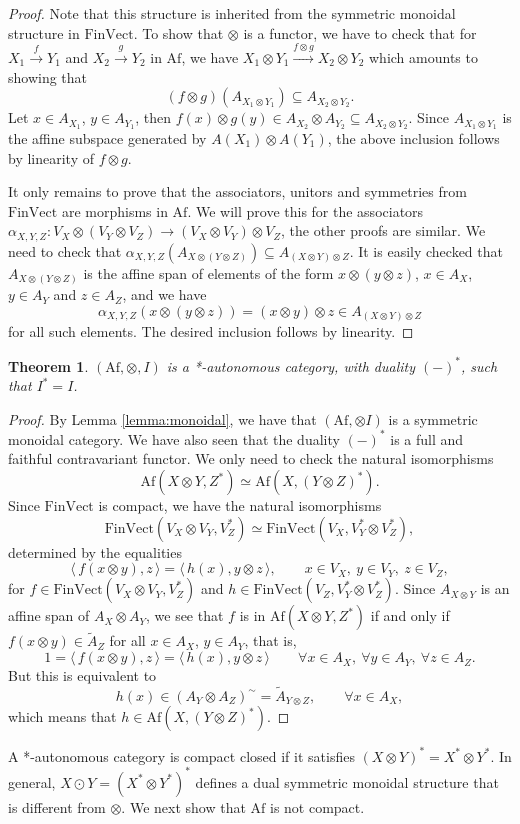 \documentclass[12pt]{article}
\newtheorem{theorem}{Theorem}
\theoremstyle{definition}
\theoremstyle{remark}
\def\<{\langle\,}
\def\>{\,\rangle}
\def \Af{\mathrm{Af}}
\def \FV{\mathrm{FinVect}}
\begin{document}
\begin{proof} Note that this structure is inherited from the symmetric monoidal structure
in $\FV$. To show that $\otimes$ is a functor, we have to check that for $X_1\xrightarrow{f} Y_1$ and $X_2\xrightarrow{g} Y_2$ in
$\Af$, we have $X_1\otimes Y_1\xrightarrow{f\otimes g} X_2\otimes Y_2$ which amounts to
showing that 
\[
(f\otimes g)(A_{X_1\otimes Y_1})\subseteq A_{X_2\otimes Y_2}.
\]
Let $x\in A_{X_1}$, $y\in A_{Y_1}$, then $f(x)\otimes g(y)\in A_{X_2}\otimes
A_{Y_2}\subseteq A_{X_2\otimes Y_2}$. Since  $A_{X_1\otimes Y_1}$ is the affine subspace
generated by $A(X_1)\otimes A(Y_1)$, the above inclusion follows by linearity of $f\otimes
g$. 

It only remains to prove that the associators, unitors and symmetries from
$\FV$ are morphisms in $\Af$. We will prove this for the associators $\alpha_{X,Y,Z}:V_X\otimes (V_Y\otimes V_Z)\to
(V_X\otimes V_Y)\otimes V_Z$, the other proofs are similar. We need to check that
$\alpha_{X,Y,Z}(A_{X\otimes(Y\otimes Z)})\subseteq A_{(X\otimes Y)\otimes Z}$. It is easily
checked that $A_{X\otimes(Y\otimes Z)}$ is the affine span of elements of the form
$x\otimes (y\otimes z)$, $x\in A_X$, $y\in A_Y$ and $z\in A_Z$, and we have
\[
\alpha_{X,Y,Z}(x\otimes (y\otimes z))=(x\otimes y)\otimes z\in A_{(X\otimes Y)\otimes Z}
\]
for all such elements. The desired inclusion follows by linearity.

\end{proof}


\begin{theorem} $(\Af,\otimes,I)$ is a *-autonomous category, with duality $(-)^*$, such
that $I^*=I$.

\end{theorem}


\begin{proof} By Lemma \ref{lemma:monoidal}, we have that $(\Af,\otimes I)$ is a symmetric
monoidal category. We have also seen that the duality $(-)^*$ is a full and faithful
contravariant functor. We only need to check the natural isomorphisms 
\[
\Af(X\otimes Y,Z^*)\simeq \Af(X,(Y\otimes Z)^*).
\]
Since $\FV$ is compact, we have the natural isomorphisms
\[
\FV(V_X\otimes V_Y,V^*_Z)\simeq \FV(V_X,V_Y^*\otimes V_Z^*),
\]
determined by the equalities
\[
\<f(x\otimes y),z\>=\<h(x),y\otimes z\>,\qquad x\in V_X,\ y\in V_Y,\ z\in V_Z,
\]
for $f\in \FV(V_X\otimes V_Y,V_Z^*)$ and $h\in \FV(V_Z,V_Y^*\otimes V_Z^*)$. Since
$A_{X\otimes Y}$ is an affine span of $A_X\otimes A_Y$, we see that
$f$ is in $\Af(X\otimes Y, Z^*)$ if and only if $f(x\otimes y)\in \tilde A_Z$ for all $x\in A_X$, $y\in
A_Y$, that is, 
\[
1=\<f(x\otimes y),z\>=\<h(x),y\otimes z\>\qquad \forall x\in A_X,\
\forall y\in A_Y,\ \forall z\in A_Z.
\]
But this is equivalent to
\[
h(x)\in (A_Y\otimes A_Z)^\sim=\tilde A_{Y\otimes Z},\qquad \forall x\in A_X,
\]
which means that $h\in \Af(X, (Y\otimes Z)^*)$.

\end{proof}
A *-autonomous category is compact closed if it satisfies $(X\otimes Y)^*=X^*\otimes
Y^*$. 
In general, $X\odot Y=(X^*\otimes Y^*)^*$ defines a dual symmetric monoidal
structure that is different from $\otimes$. 
We next show that $\Af$ is not compact.
\end{document}
